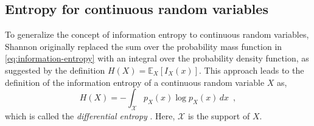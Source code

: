 \subsection{Entropy for continuous random variables}

To generalize the concept of information entropy to continuous random variables, Shannon originally replaced the sum over the probability mass function in \eqref{eq:information-entropy} with an integral over the probability density function, as suggested by the definition $H(X) = \mathbb{E}_X\left[I_X(x)\right]$. This approach leads to the definition of the information entropy of a continuous random variable $X$ as, 
%
\begin{equation} \label{eq:differential-entropy}
    H(X) = - \int_{\mathcal{X}} p_X(x) \log p_X(x) \, dx \enspace ,
\end{equation}
%
which is called the \emph{differential entropy} \cite{shannon_mathematical_1948}. Here, $\mathcal{X}$ is the support of $X$. 

